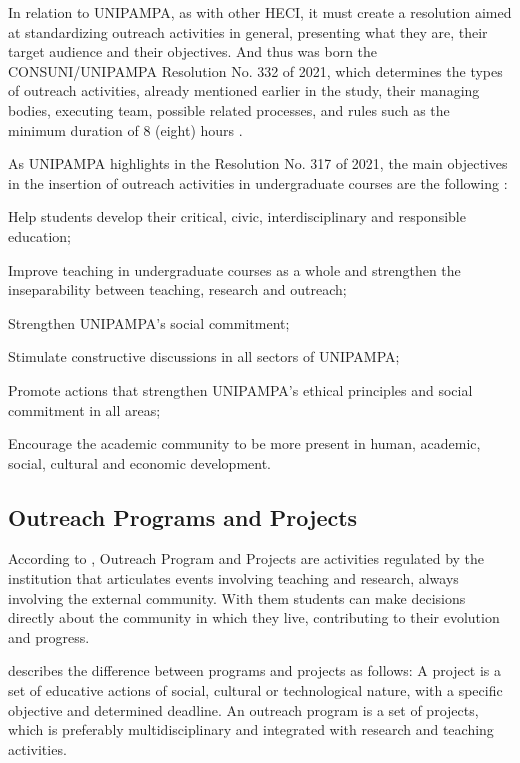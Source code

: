 In relation to \ac{UNIPAMPA}, as with other \ac{HECI}, it must create a resolution aimed at standardizing outreach activities in general, presenting what they are, their target audience and their objectives. And thus was born the CONSUNI/UNIPAMPA Resolution No. 332 of 2021, which determines the types of outreach activities, already mentioned earlier in the study, their managing bodies, executing team, possible related processes, and rules such as the minimum duration of 8 (eight) hours \cite{Resolucao-332:2021}.

As \ac{UNIPAMPA} highlights in the Resolution No. 317 of 2021, the main objectives in the insertion of outreach activities in undergraduate courses are the following \cite{res317}:
\begin{inparaenum}[(i)]
  \item Help students develop their critical, civic, interdisciplinary and responsible education;
  \item Improve teaching in undergraduate courses as a whole and strengthen the inseparability between teaching, research and outreach;
  \item Strengthen \ac{UNIPAMPA}'s social commitment;
  \item Stimulate constructive discussions in all sectors of \ac{UNIPAMPA};
  \item Promote actions that strengthen \ac{UNIPAMPA}'s ethical principles and social commitment in all areas;
  \item Encourage the academic community to be more present in human, academic, social, cultural and economic development.
\end{inparaenum}

\subsection{Outreach Programs and Projects}\label{sec:bac-programs-projects}

According to , Outreach Program and Projects are activities regulated by the institution that articulates events involving teaching and research, always involving the external community. With them students can make decisions directly about the community in which they live, contributing to their evolution and progress.

 describes the difference between programs and projects as follows: A project is a set of educative actions of social, cultural or technological nature, with a specific objective and determined deadline. An outreach program is a set of projects, which is preferably multidisciplinary and integrated with research and teaching activities.

